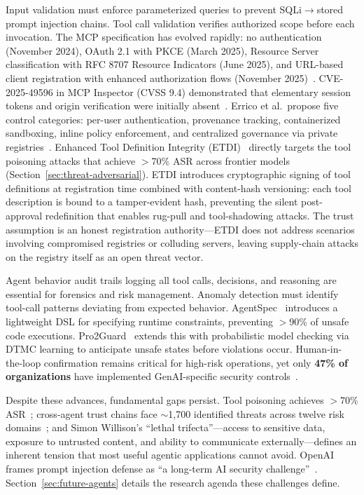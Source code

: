\begin{description}[style=unboxed,leftmargin=0.5em,labelindent=0em,nosep]
\item[MCP-specific security.] Input validation must enforce parameterized queries to prevent SQLi$\to$stored prompt injection chains. Tool call validation verifies authorized scope before each invocation. The MCP specification has evolved rapidly: no authentication (November 2024), OAuth 2.1 with PKCE (March 2025), Resource Server classification with RFC 8707 Resource Indicators (June 2025), and URL-based client registration with enhanced authorization flows (November 2025)~\cite{mcpspec2025}. CVE-2025-49596 in MCP Inspector (CVSS 9.4) demonstrated that elementary session tokens and origin verification were initially absent~\cite{oligo2025inspector}. Errico et al.\ propose five control categories: per-user authentication, provenance tracking, containerized sandboxing, inline policy enforcement, and centralized governance via private registries~\cite{errico2025mcpsecurity}. Enhanced Tool Definition Integrity (ETDI)~\cite{bhatt2025etdi} directly targets the tool poisoning attacks that achieve $>$70\% ASR across frontier models (Section~\ref{sec:threat-adversarial}). ETDI introduces cryptographic signing of tool definitions at registration time combined with content-hash versioning: each tool description is bound to a tamper-evident hash, preventing the silent post-approval redefinition that enables rug-pull and tool-shadowing attacks. The trust assumption is an honest registration authority---ETDI does not address scenarios involving compromised registries or colluding servers, leaving supply-chain attacks on the registry itself as an open threat vector.

\item[Monitoring and runtime verification.] Agent behavior audit trails logging all tool calls, decisions, and reasoning are essential for forensics and risk management. Anomaly detection must identify tool-call patterns deviating from expected behavior. AgentSpec~\cite{wang2025agentspec} introduces a lightweight DSL for specifying runtime constraints, preventing $>$90\% of unsafe code executions. Pro2Guard~\cite{pro2guard2025} extends this with probabilistic model checking via DTMC learning to anticipate unsafe states before violations occur. Human-in-the-loop confirmation remains critical for high-risk operations, yet only \textbf{47\% of organizations} have implemented GenAI-specific security controls~\cite{microsoft2026cyberpulse}.

\item[Open challenges.] Despite these advances, fundamental gaps persist. Tool poisoning achieves $>$70\% ASR~\cite{invariant2025toolpoisoning}; cross-agent trust chains face $\sim$1,700 identified threats across twelve risk domains~\cite{multiagent2026threats}; and Simon Willison's ``lethal trifecta''---access to sensitive data, exposure to untrusted content, and ability to communicate externally---defines an inherent tension that most useful agentic applications cannot avoid. OpenAI frames prompt injection defense as ``a long-term AI security challenge''~\cite{openai2025atlas}. Section~\ref{sec:future-agents} details the research agenda these challenges define.
\end{description}

